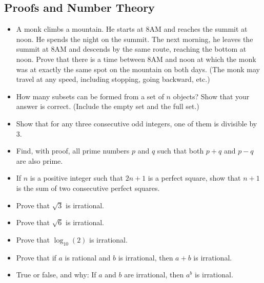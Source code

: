 \documentclass[12pt]{article}
\begin{document}
\subsection{Proofs and Number Theory}
\begin{itemize}
  \item A monk climbs a mountain. He starts at 8AM and reaches the summit at noon. He spends the night on the summit. The next morning, he leaves the summit at 8AM and descends by the same route, reaching the bottom at noon. Prove that there is a time between 8AM and noon at which the monk was at exactly the same spot on the mountain on both days. (The monk may travel at any speed, including stopping, going backward, etc.)

  \item How many subsets can be formed from a set of $n$ objects? Show that your answer is correct. (Include the empty set and the full set.)

  \item Show that for any three consecutive odd integers, one of them is divisible by 3.

  \item Find, with proof, all prime numbers $p$ and $q$ such that both $p+q$ and $p-q$ are also prime.

  \item If $n$ is a positive integer such that $2n+1$ is a perfect square, show that $n+1$ is the sum of two consecutive perfect squares.

  \item Prove that $\sqrt{3}$ is irrational.

  \item Prove that $\sqrt{6}$ is irrational.

  \item Prove that $\log_{10}(2)$ is irrational.

  \item Prove that if $a$ is rational and $b$ is irrational, then $a + b$ is irrational.

  \item  True or false, and why: If $a$ and $b$ are irrational, then $a^b$ is irrational.
\end{itemize}
\end{document}

